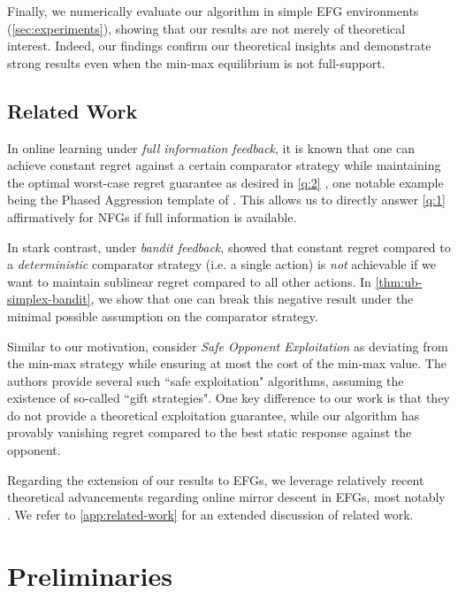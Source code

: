 \documentclass[11pt]{article}
\begin{document}
Finally, we numerically evaluate our algorithm in simple EFG environments (\cref{sec:experiments}), showing that our results are not merely of theoretical interest. Indeed, our findings confirm our theoretical insights and demonstrate strong results even when the min-max equilibrium is not full-support.

\subsection{Related Work} \label{sec:related-work}

In online learning under \emph{full information feedback}, it is known that one can achieve constant regret against a certain comparator strategy while maintaining the optimal worst-case regret guarantee as desired in \cref{q:2} \citep{hutter2005adaptive,even2008regret,kapralov2011prediction,koolen2013pareto,sani2014exploiting,orabona2016coin,cutkosky2018black,orabona2019modern}, one notable example being the Phased Aggression template of \citet{even2008regret}. This allows us to directly answer \cref{q:1} affirmatively for NFGs if full information is available.

In stark contrast, under \textit{bandit feedback}, \citet{lattimore2015pareto} showed that constant regret compared to a \emph{deterministic} comparator strategy (i.e. a single action) is \emph{not} achievable if we want to maintain sublinear regret compared to all other actions. In \cref{thm:ub-simplex-bandit}, we show that one can break this negative result under the minimal possible assumption on the comparator strategy.

Similar to our motivation, \citet{ganzfried2015safe} consider \emph{Safe Opponent Exploitation} as deviating from the min-max strategy while ensuring at most the cost of the min-max value. The authors provide several such ``safe exploitation" algorithms, assuming the existence of so-called ``gift strategies". One key difference to our work is that they do not provide a theoretical exploitation guarantee, while our algorithm has provably vanishing regret compared to the best static response against the opponent. 

Regarding the extension of our results to EFGs, we leverage relatively recent theoretical advancements regarding online mirror descent in EFGs, most notably \citet{kozuno2021model,bai2022near}. We refer to \cref{app:related-work} for an extended discussion of related work. 

\section{Preliminaries} \label{sec:preliminaries}
\end{document}
